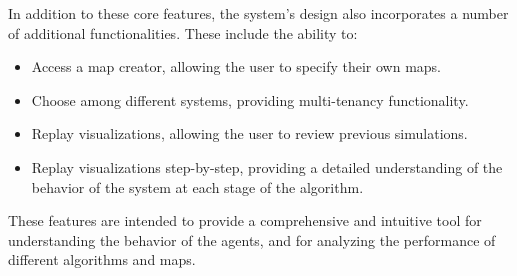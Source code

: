 In addition to these core features, the system's design also incorporates a number of additional functionalities. These include the ability to:

\begin{itemize}
\itemsep0em
\item Access a map creator, allowing the user to specify their own maps.
\item Choose among different systems, providing multi-tenancy functionality.
\item Replay visualizations, allowing the user to review previous simulations.
\item Replay visualizations step-by-step, providing a detailed understanding of the behavior of the system at each stage of the algorithm.
\end{itemize}

These features are intended to provide a comprehensive and intuitive tool for understanding the behavior of the agents, and for analyzing the performance of different algorithms and maps.